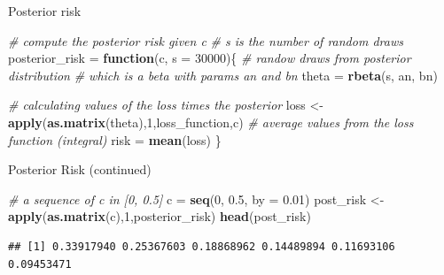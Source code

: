 \documentclass[
  ignorenonframetext,
]{beamer}
\newenvironment{Shaded}{\begin{snugshade}}{\end{snugshade}}
\newcommand{\CommentTok}[1]{\textcolor[rgb]{0.56,0.35,0.01}{\textit{#1}}}
\newcommand{\ControlFlowTok}[1]{\textcolor[rgb]{0.13,0.29,0.53}{\textbf{#1}}}
\newcommand{\DataTypeTok}[1]{\textcolor[rgb]{0.13,0.29,0.53}{#1}}
\newcommand{\DecValTok}[1]{\textcolor[rgb]{0.00,0.00,0.81}{#1}}
\newcommand{\FloatTok}[1]{\textcolor[rgb]{0.00,0.00,0.81}{#1}}
\newcommand{\KeywordTok}[1]{\textcolor[rgb]{0.13,0.29,0.53}{\textbf{#1}}}
\newcommand{\NormalTok}[1]{#1}
\newcommand{\StringTok}[1]{\textcolor[rgb]{0.31,0.60,0.02}{#1}}
\begin{document}
\begin{frame}[fragile]{Posterior risk}
\protect\hypertarget{posterior-risk}{}

\begin{Shaded}
\begin{Highlighting}[]
\CommentTok{# compute the posterior risk given c }
\CommentTok{# s is the number of random draws }
\NormalTok{posterior_risk =}\StringTok{ }\ControlFlowTok{function}\NormalTok{(c, }\DataTypeTok{s =} \DecValTok{30000}\NormalTok{)\{}
  \CommentTok{# randow draws from posterior distribution}
  \CommentTok{# which is a beta with params an and bn}
\NormalTok{  theta =}\StringTok{ }\KeywordTok{rbeta}\NormalTok{(s, an, bn)}
  
  \CommentTok{# calculating values of the loss times the posterior}
\NormalTok{  loss <-}\StringTok{ }\KeywordTok{apply}\NormalTok{(}\KeywordTok{as.matrix}\NormalTok{(theta),}\DecValTok{1}\NormalTok{,loss_function,c)}
  \CommentTok{# average values from the loss function (integral)}
\NormalTok{  risk =}\StringTok{ }\KeywordTok{mean}\NormalTok{(loss)}
\NormalTok{\}}
\end{Highlighting}
\end{Shaded}

\end{frame}

\begin{frame}[fragile]{Posterior Risk (continued)}
\protect\hypertarget{posterior-risk-continued}{}

\begin{Shaded}
\begin{Highlighting}[]
\CommentTok{# a sequence of c in [0, 0.5]}
\NormalTok{c =}\StringTok{ }\KeywordTok{seq}\NormalTok{(}\DecValTok{0}\NormalTok{, }\FloatTok{0.5}\NormalTok{, }\DataTypeTok{by =} \FloatTok{0.01}\NormalTok{)}
\NormalTok{post_risk <-}\StringTok{ }\KeywordTok{apply}\NormalTok{(}\KeywordTok{as.matrix}\NormalTok{(c),}\DecValTok{1}\NormalTok{,posterior_risk)}
\KeywordTok{head}\NormalTok{(post_risk)}
\end{Highlighting}
\end{Shaded}

\begin{verbatim}
## [1] 0.33917940 0.25367603 0.18868962 0.14489894 0.11693106 0.09453471
\end{verbatim}

\end{frame}
\end{document}
